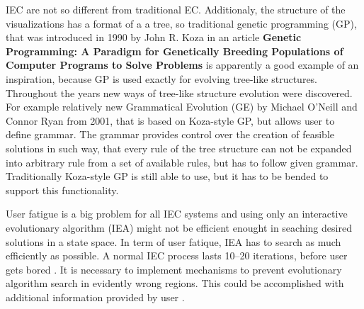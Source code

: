 IEC are not so different from traditional EC. Additionaly, the structure of the visualizations has a format of a a tree, so traditional genetic programming (GP), that was introduced in 1990 by John R. Koza in an article \textbf{Genetic Programming: A Paradigm for Genetically Breeding Populations of Computer Programs to Solve Problems} \cite{genetic-programming} is apparently a good example of an inspiration, because GP is used exactly for evolving tree-like structures. Throughout the years new ways of tree-like structure evolution were discovered. For example relatively new Grammatical Evolution (GE) \cite{grammatical-evolution} by Michael O'Neill and Connor Ryan from 2001, that is based on Koza-style GP, but allows user to define grammar. The grammar provides control over the creation of feasible solutions in such way, that every rule of the tree structure can not be expanded into arbitrary rule from a set of available rules, but has to follow given grammar. Traditionally Koza-style GP is still able to use, but it has to be bended to support this functionality.

User fatigue is a big problem for all IEC systems and using only an interactive evolutionary algorithm (IEA) might not be efficient enought in seaching desired solutions in a state space. In term of user fatique, IEA has to search as much efficiently as possible. A normal IEC process lasts 10--20 iterations, before user gets bored \cite{tagakipaper}. It is necessary to implement mechanisms to prevent evolutionary algorithm search in evidently wrong regions. This could be accomplished with additional information provided by user \cite{user-fatique-in-iec}.
